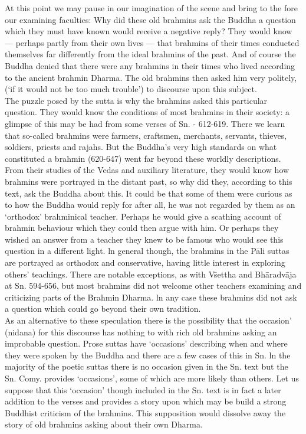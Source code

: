 At this point we may pause in our imagination of the scene and bring to the fore our examining faculties: Why did these old brahmins ask the Buddha a question which they must have known would receive a negative reply? They would know — perhaps partly from their own lives — that brahmins of their times conducted themselves far differently from the ideal brahmins of the past. And of course the Buddha denied that there were any brahmins in their times who lived according to the ancient brahmin Dharma. The old brahmins then asked him very politely, (`if it would not be too much trouble') to discourse upon this subject.\\

The puzzle posed by the sutta is why the brahmins asked this particular question. They would know the conditions of most brahmins in their society: a glimpse of this may be had from some verses of Sn. - 612-619. There we learn that so-called brahmins were farmers, craftsmen, merchants, servants, thieves, soldiers, priests and rajahs. But the Buddha's very high standards on what constituted a brahmin (620-647) went far beyond these worldly descriptions.\\

From their studies of the Vedas and auxiliary literature, they would know how brahmins were portrayed in the distant past, so why did they, according to this text, ask the Buddha about this. It could be that some of them were curious as to how the Buddha would reply for after all, he was not regarded by them as an `orthodox' brahminical teacher. Perhaps he would give a scathing account of brahmin behaviour which they could then argue with him. Or perhaps they wished an answer from a teacher they knew to be famous who would see this question in a different light. ln general though, the brahmins in the P\=ali suttas are portrayed as orthodox and conservative, having little interest in exploring others' teachings. There are notable exceptions, as with V\=settha and Bh\=aradv\=aja at Sn. 594-656, but most brahmins did not welcome other teachers examining and criticizing parts of the Brahmin Dharma. ln any case these brahmins did not ask a question which could go beyond their own tradition.\\

As an alternative to these speculation there is the possibility that the occasion' (nidana) for this discourse has nothing to with rich old brahmins asking an improbable question. Prose suttas have `occasions' describing when and where they were spoken by the Buddha and there are a few cases of this in Sn. ln the majority of the poetic suttas there is no occasion given in the Sn. text but the Sn. Comy. provides `occasions', some of which are more likely than others. Let us suppose that this `occasion' though included in the Sn. text is in fact a later addition to the verses and provides a story upon which may be build a strong Buddhist criticism of the brahmins. This supposition would dissolve away the story of old brahmins asking about their own Dharma.

